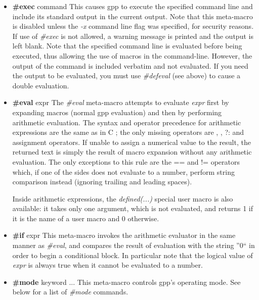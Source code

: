 \begin{itemize}
\item {\bf \#exec }command\htmlBR
This causes gpp to execute the specified command line and include its standard
output in the current output. Note that this meta-macro is disabled unless the
{\it -x} command line flag was specified, for security reasons. If use of {\it
\#exec} is not allowed, a warning message is printed and the output is left
blank. Note that the specified command line is evaluated before being
executed, thus allowing the use of macros in the command-line. However, the
output of the command is included verbatim and not evaluated. If you need the
output to be evaluated, you must use {\it \#defeval} (see above) to cause a
double evaluation. 

\item {\bf \#eval }expr\htmlBR
The {\it \#eval} meta-macro attempts to evaluate {\it expr} first by expanding
macros (normal gpp evaluation) and then by performing arithmetic evaluation.
The syntax and operator precedence for arithmetic expressions are the same as
in C ; the only missing operators are {\htmlLt}{\htmlLt}, {\htmlGt}{\htmlGt},
?: and assignment operators. If unable to assign a numerical value to the
result, the returned text is simply the result of macro expansion without any
arithmetic evaluation. The only exceptions to this rule are the == and !=
operators which, if one of the sides does not evaluate to a number, perform
string comparison instead (ignoring trailing and leading spaces). 

Inside arithmetic expressions, the {\it defined(...)} special user macro is
also available: it takes only one argument, which is not evaluated, and
returns 1 if it is the name of a user macro and 0 otherwise. 

\item {\bf \#if }expr\htmlBR
This meta-macro invokes the arithmetic evaluator in the same manner as {\it
\#eval}, and compares the result of evaluation with the string ''0`` in order
to begin a conditional block. In particular note that the logical value of
{\it expr} is always true when it cannot be evaluated to a number. 

\item {\bf \#mode }keyword ...\htmlBR
This meta-macro controls gpp's operating mode. See below for a list of {\it
\#mode} commands. 
\end{itemize}

